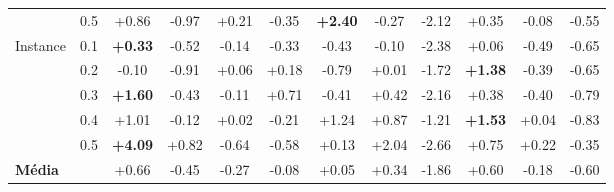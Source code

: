 \begin{table}[htbp]
{\begin{tabular}{llcccccccccc}
 & 0.5 & +0.86 & -0.97 & +0.21 & -0.35 & \textbf{+2.40} & -0.27 & -2.12 & +0.35 & -0.08 & -0.55 \\
Instance & 0.1 & \textbf{+0.33} & -0.52 & -0.14 & -0.33 & -0.43 & -0.10 & -2.38 & +0.06 & -0.49 & -0.65 \\
 & 0.2 & -0.10 & -0.91 & +0.06 & +0.18 & -0.79 & +0.01 & -1.72 & \textbf{+1.38} & -0.39 & -0.65 \\
 & 0.3 & \textbf{+1.60} & -0.43 & -0.11 & +0.71 & -0.41 & +0.42 & -2.16 & +0.38 & -0.40 & -0.79 \\
 & 0.4 & +1.01 & -0.12 & +0.02 & -0.21 & +1.24 & +0.87 & -1.21 & \textbf{+1.53} & +0.04 & -0.83 \\
 & 0.5 & \textbf{+4.09} & +0.82 & -0.64 & -0.58 & +0.13 & +2.04 & -2.66 & +0.75 & +0.22 & -0.35 \\
\midrule
\textbf{Média} &  & +0.66 & -0.45 & -0.27 & -0.08 & +0.05 & +0.34 & -1.86 & +0.60 & -0.18 & -0.60 \\
\bottomrule
\end{tabular}
}
\end{table}

